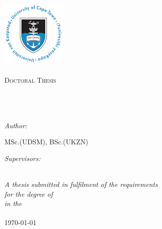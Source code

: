 \documentclass[11pt, oneside]{Thesis} %
\begin{document}
\begin{titlepage}
\begin{center}
\vspace*{0.5 cm}
\includegraphics[scale = 0.75]{Logo}\\[1.0 cm]
\textsc{\LARGE \univname}\\[1.5cm] %
\textsc{\Large Doctoral Thesis}\\[0.5cm] %

\HRule \\[0.5cm] %
{\huge \bfseries \ttitle}\\[0.4cm] %
\HRule \\[1.5cm] %

\begin{minipage}{0.4\textwidth}
\begin{flushleft} \large
\emph{Author:}\\
{\authornames} %

MSc.(UDSM), BSc.(UKZN)
\end{flushleft}
\end{minipage}
\begin{minipage}{0.4\textwidth}
\begin{flushright} \large

\emph{Supervisors:} \\
{\supname} %
\end{flushright}
\end{minipage}\\[3cm]
\large \textit{A thesis submitted in fulfilment of the requirements\\ for the degree of \degreename}\\[0.3cm] %
\textit{in the}\\[0.4cm]
\deptname\\[2cm] %
{\large \today}\\[4cm] %
\vfill
\end{center}

\end{titlepage}
\clearpage
\end{document}
